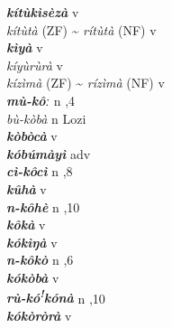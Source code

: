 \begin{multicols}{2}
{{\bfseries\itshape kítùkìsèzà}} \relax  v  \relax   \relax  {} \relax   \relax  \\
{\textit{kítùtà} (ZF) {\textasciitilde} \textit{rítùtà} (NF)} \relax  v  \relax   \relax  {} \relax   \relax  \\
{{\bfseries\itshape kìyà}} \relax  v  \relax   \relax  {} \relax   \relax  \\
{\textit{kíyùrùrà}} \relax  v  \relax   \relax  {} \relax   \relax  \\
{\textit{kízìmà} (ZF) {\textasciitilde} \textit{rízìmà} (NF)} \relax  v  \relax   \relax  {} \relax   \relax  \\
{{\bfseries\itshape mù-kôː}} \relax  n  ,4  \relax   \relax  \\
{\textit{bù-kòbà}} \relax  n   \relax  {} \relax  Lozi \relax  \\
{{\bfseries\itshape kòbòcà}} \relax  v  \relax   \relax  {} \relax   \relax  \\
{{\bfseries\itshape kóbúmàyì}} \relax  adv  \relax   \relax  {} \relax   \relax  \\
{{\bfseries\itshape cì-kôcì}} \relax  n  ,8  \relax   \relax  \\
{{\bfseries\itshape kûhà}} \relax  v  \relax   \relax  {} \relax   \relax  \\
{{\bfseries\itshape n-kôhè}} \relax  n  ,10  \relax   \relax  \\
{{\bfseries\itshape kôkà}} \relax  v  \relax   \relax  {} \relax   \relax  \\
{{\bfseries\itshape kókìŋà}} \relax  v  \relax   \relax  {} \relax   \relax  \\
{{\bfseries\itshape n-kôkò}} \relax  n  ,6  \relax   \relax  \\
{{\bfseries\itshape kókòbà}} \relax  v  \relax   \relax  {} \relax   \relax  \\
{{\bfseries\itshape rù-kó\textsuperscript{!}kónà}} \relax  n  ,10  \relax   \relax  \\
{{\bfseries\itshape kókòròrà}} \relax  v  \relax   \relax  {} \relax   \relax  \\

\end{multicols}
